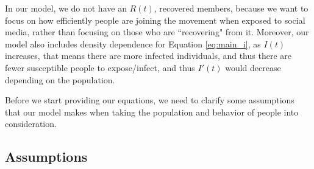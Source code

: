 \documentclass{article}
\begin{document}
    In our model, we do not have an $R(t)$, recovered members, because we want to focus on how efficiently people are joining the movement when exposed to social media, rather than focusing on those who are ``recovering" from it. Moreover, our model also includes density dependence for Equation \ref{eq:main_i}, as $I(t)$ increases, that means there are more infected individuals, and thus there are fewer susceptible people to expose/infect, and thus $I'(t)$ would decrease depending on the population.
    
    Before we start providing our equations, we need to clarify some assumptions that our model makes when taking the population and behavior of people into consideration.

    \subsection{Assumptions}
    
\end{document}
